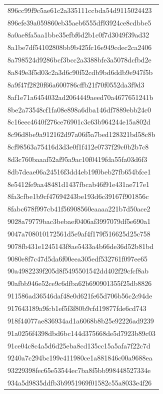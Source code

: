 \begin{tabular}{l}
896cc99f9c5ae61c2a335111ccbda54d9115024423 \\
896efe39a059860eb35aeb6555df93924ce8cdbbe5 \\
8a0ae8fa5aa1bbe35efbf6d2b1c0f7d3049f39ad32 \\
8a1be7df54102808bb9b425fc16e949cdec2ca2406 \\
8a798524d9286bcf3bcc2a3388bfe3a5078dcfbd2e \\
8a849e3f5d03c2a3d6c90f52cdb9bd6ddb9e947f5b \\
8a9f47f2820f66a600786cffb21f70f0552da3f9d3 \\
8af1e71a6454032ad2064449aeed70a4677651241b \\
8be2a73548cf1fa08e898a6dba146df7889ebb24c0 \\
8c16eec4640f276ce76901c3c63b964244e15a802d \\
8c96d8be9a912162d97a06f5a7bed128321bd58c8b \\
8cf98563a75416d3d3e0f1f412e0737f29c0b2b7c8 \\
8d3c760baaaf52af95a9ac10f0419fda55fa03d6f3 \\
8db7deae06a24516f3dd4eb19f0beb27fb654bfce1 \\
8e5412fe9aa48481d1437fbcab46f91e431ae717e1 \\
8fa3cfbe1b9cf47694243be193d6c39167f901856c \\
8fabc678f997cb41f56908560eaaaa221b7d50ace2 \\
9028a79779bac3bebaef0406af3997079df5e690a1 \\
9047a708010172561d5e9af4f179f516625d25c758 \\
9078fb431e1245143f8ae5433a4b66de36d52b81bd \\
9080e8f7c47d5da6f00eea305edf532761f097ee65 \\
90a4982239f205d8f5495501542dd402f29cfcf8ab \\
90afbb946e52ce9c6dfba62b690901355f25db8826 \\
911586ad36546daf48e0d621fe65d706b56c2c94de \\
917643189a9fcb1ef5f3f80b9cfd19877fde6cd743 \\
918f44077ae836934ad1a6068b8b25e92226ad9239 \\
91a0256f4398dbd6bc144d375668de5d7923b89c03 \\
91ce04c8c4a5d6d25eba8cd135cc15a5afa7f22c7d \\
9240a7c294bc199e411980ce1a881846c00a9688ea \\
93229398fec65e53544ec7ba8f5bb998448527334e \\
934a5d9835ddfb3b9951969f01582c55a8033e4f26 \\

\end{tabular}
